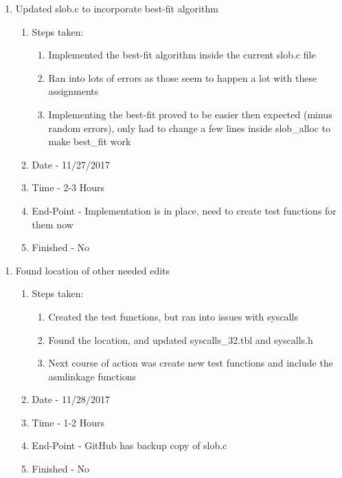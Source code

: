 \documentclass[journal,10pt,onecolumn,compsoc]{IEEEtran} \usepackage[margin=1.0in]{geometry} \usepackage{pdfpages}
\begin{document}
    \begin {enumerate}
    	\item Updated slob.c to incorporate best-fit algorithm
        \begin{enumerate}
            \item Steps taken:
        	\begin{enumerate}
                  \item Implemented the best-fit algorithm inside the current slob.c file
                  \item Ran into lots of errors as those seem to happen a lot with these assignments
                  \item Implementing the best-fit proved to be easier then expected (minus random errors), only had to change a few lines inside slob\_alloc to make best\_fit work
     		\end{enumerate}   
            \item Date - 11/27/2017
            \item Time - 2-3 Hours
            \item End-Point - Implementation is in place, need to create test functions for them now
            \item Finished - No  \\
        \end{enumerate}
	\end{enumerate}
    
    \begin {enumerate}
    	\item Found location of other needed edits
        \begin{enumerate}
            \item Steps taken:
        	\begin{enumerate}
                  \item Created the test functions, but ran into issues with syscalls
                  \item Found the location, and updated syscalls\_32.tbl and syscalls.h
                  \item Next course of action was create new test functions and include the asmlinkage functions
     		\end{enumerate}   
            \item Date - 11/28/2017
            \item Time - 1-2 Hours
            \item End-Point - GitHub has backup copy of slob.c
            \item Finished - No  \\
        \end{enumerate}
	\end{enumerate}
    
\end{document}
